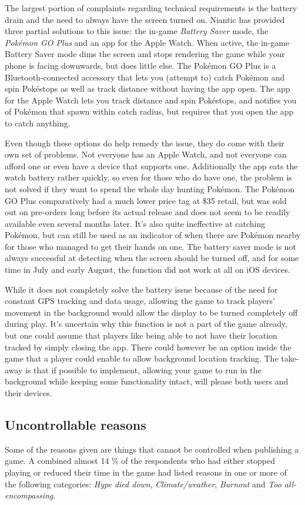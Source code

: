 The largest portion of complaints regarding technical requirements is the battery drain and the need to always have the screen turned on. Niantic has provided three partial solutions to this issue: the in-game \emph{Battery Saver} mode, the \emph{Pokémon GO Plus} and an app for the Apple Watch. When active, the in-game Battery Saver mode dims the screen and stops rendering the game while your phone is facing downwards, but does little else. The Pokémon GO Plus is a Bluetooth-connected accessory that lets you (attempt to) catch Pokémon and spin Pokéstops as well as track distance without having the app open. The app for the Apple Watch lets you track distance and spin Pokéstops, and notifies you of Pokémon that spawn within catch radius, but requires that you open the app to catch anything.

Even though these options do help remedy the issue, they do come with their own set of problems. Not everyone has an Apple Watch, and not everyone can afford one or even have a device that supports one. Additionally the app eats the watch battery rather quickly, so even for those who do have one, the problem is not solved if they want to spend the whole day hunting Pokémon. The Pokémon GO Plus comparatively had a much lower price tag at \$35 retail, but was sold out on pre-orders long before its actual release and does not seem to be readily available even several months later. It's also quite ineffective at catching Pokémon, but can still be used as an indicator of when there are Pokémon nearby for those who managed to get their hands on one. The battery saver mode is not always successful at detecting when the screen should be turned off, and for some time in July and early August, the function did not work at all on iOS devices.

While it does not completely solve the battery issue because of the need for constant GPS tracking and data usage, allowing the game to track players' movement in the background would allow the display to be turned completely off during play. It's uncertain why this function is not a part of the game already, but one could assume that players like being able to not have their location tracked by simply closing the app. There could however be an option inside the game that a player could enable to allow background location tracking. The take-away is that if possible to implement, allowing your game to run in the background while keeping some functionality intact, will please both users and their devices.

\subsection{Uncontrollable reasons}
Some of the reasons given are things that cannot be controlled when publishing a game. A combined almost 14 \% of the respondents who had either stopped playing or reduced their time in the game had listed reasons in one or more of the following categories: \emph{Hype died down}, \emph{Climate/weather}, \emph{Burnout} and \emph{Too all-encompassing}.

